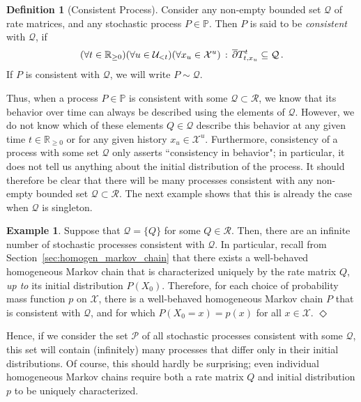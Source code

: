 \documentclass[10pt]{paper}
\theoremstyle{definition}
\newtheorem{exmp}{Example}%
\newtheorem{definition}{Definition}
\newcommand{\reals}{\mathbb{R}}
\newcommand{\realsnonneg}{\reals_{\geq 0}}
\newcommand{\states}{\mathcal{X}}
\newcommand{\processes}{\mathbb{P}}
\newcommand{\rateset}{\mathcal{Q}}
\newcommand{\exampleend}{\hfill$\Diamond$}
\begin{document}
\begin{definition}[Consistent Process]
Consider any non-empty bounded set $\rateset$ of rate matrices, and any stochastic process $P\in\processes$. Then $P$ is said to be \emph{consistent} with $\rateset$, if
\begin{equation*}
(\forall t\in\realsnonneg)(\forall u\in\mathcal{U}_{<t})(\forall x_u\in\states^u)\,:\, \smash{\overline{\partial}}T_{t,x_u}^t \subseteq \rateset\,.
\end{equation*}
If $P$ is consistent with $\rateset$, we will write $P\sim\rateset$.
\end{definition}

Thus, when a process $P\in\processes$ is consistent with some $\rateset\subset\mathcal{R}$, we know that its behavior over time can always be described using the elements of $\rateset$. However, we do not know which of these elements $Q\in\rateset$ describe this behavior at any given time  $t\in\realsnonneg$ or for any given history $x_u\in\states^u$. Furthermore, consistency of a process with some set $\rateset$ only asserts ``consistency in behavior"; in particular, it does not tell us anything about the initial distribution of the process. It should therefore be clear that there will be many processes consistent with any non-empty bounded set $\rateset\subset\mathcal{R}$. The next example shows that this is already the case when $\rateset$ is singleton.

\begin{exmp}\label{example:singleton_infinite_consistent}
Suppose that $\rateset=\{Q\}$ for some $Q\in\mathcal{R}$. Then, there are an infinite number of stochastic processes consistent with $\rateset$. In particular, recall from Section~\ref{sec:homogen_markov_chain} that there exists a well-behaved homogeneous Markov chain that is characterized uniquely by the rate matrix $Q$, \emph{up to} its initial distribution $P(X_0)$. Therefore, for each choice of probability mass function $p$ on $\states$, there is a well-behaved homogeneous Markov chain $P$ that is consistent with $\rateset$, and for which $P(X_0=x)=p(x)$ for all $x\in\states$.
\exampleend
\end{exmp}

Hence, if we consider the set $\mathcal{P}$ of all stochastic processes consistent with some $\rateset$, this set will contain (infinitely) many processes that differ only in their initial distributions. Of course, this should hardly be surprising; even individual homogeneous Markov chains require both a rate matrix $Q$ and initial distribution $p$ to be uniquely characterized. 
\end{document}

